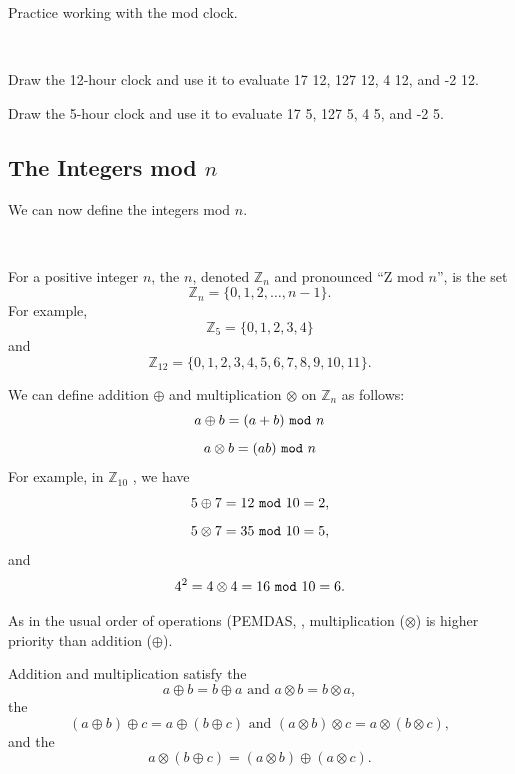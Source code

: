 Practice working with the mod clock.

\begin{act}
\label{act_mod_clock} 
~
    \begin{actpart}
        \item Draw the 12-hour clock and use it to evaluate 17  12, 127  12, 4  12, and -2  12.
        \item Draw the 5-hour clock and use it to evaluate 17  5, 127  5, 4  5, and -2  5. 
    \end{actpart}
\end{act}


\newcommand{\subzn}{The Integers mod $n$}
\subsection{\subzn}
\label{sub_integers_mod_n}

We can now define the integers mod $n$.

\begin{defn}
\label{defn_integers_modn}    
~
    \begin{apart}
        \item For a positive integer $n$, the  $n$, denoted $\mathbb{Z}_n$ and pronounced ``Z mod $n$'', is the set 
            $$\mathbb{Z}_n = \{0, 1, 2,\ldots, n-1\}.$$
        For example,
            $$\mathbb{Z}_5 = \{0,1,2,3,4\}$$
        and
            $$\mathbb{Z}_{12} = \{0,1,2,3,4,5,6,7,8,9,10,11\}.$$

        \item We can define addition $\oplus$ and multiplication $\otimes$ on $\mathbb{Z}_n$ as follows:
            $$a \oplus b = (a+b)~\texttt{mod}~n$$
            $$a \otimes b = (ab)~\texttt{mod}~n$$
        For example, in $\mathbb{Z}_{10}$ , we have 
            $$5 \oplus 7 = 12~\texttt{mod}~10 = 2,$$
            $$5 \otimes 7 = 35~\texttt{mod}~10 = 5,$$  
        and $$4^2 = 4 \otimes 4 = 16 ~\texttt{mod}~10 = 6.$$ 
        \item As in the usual order of operations (PEMDAS, , multiplication ($\otimes$) is higher priority than addition ($\oplus$).
        \item Addition and multiplication satisfy the  $$a \oplus b = b \oplus a \text{ and } a \otimes b = b \otimes a,$$ the  $$(a \oplus b) \oplus c = a \oplus (b \oplus c) \text{ and } (a \otimes b) \otimes c = a \otimes (b \otimes c),$$ and the  $$a \otimes (b \oplus c) = (a \otimes b) \oplus (a \otimes c).$$
    \end{apart}
\end{defn}

